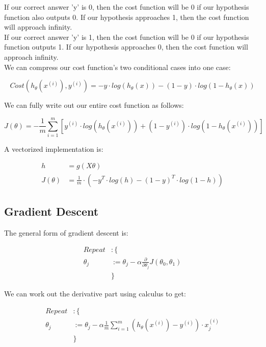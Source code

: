 If our correct answer 'y' is 0, then the cost function will be 0 if our hypothesis function also outputs 0. If our hypothesis approaches 1, then the cost function will approach infinity.\\

If our correct answer 'y' is 1, then the cost function will be 0 if our hypothesis function outputs 1. If our hypothesis approaches 0, then the cost function will approach infinity.\\

We can compress our cost function's two conditional cases into one case:

\begin{equation}
Cost(h_\theta(x^{(i)}),  y^{(i)}) = -y\cdot log(h_\theta(x)) -(1-y)\cdot log(1-h_\theta(x)) 
\end{equation}

We can fully write out our entire cost function as follows:

\begin{center}
$$J(\theta) = -\frac{1}{m}\sum_{i=1}^{m}\left[y^{(i)}\cdot log(h_\theta(x^{(i)})) +(1-y^{(i)})\cdot log(1-h_\theta(x^{(i)}))\right] $$
\end{center}

A vectorized implementation is:

\begin{align*}
h&=g(X\theta) \\
J(\theta)&=\frac{1}{m}\cdot(-y^T\cdot log(h)-(1-y)^T\cdot log(1-h))
\end{align*}

\subsection{Gradient Descent}

The general form of gradient descent is:

\begin{align*}
Repeat &: \{\\
\theta_j &:= \theta_j - \alpha \frac{\partial}{\partial \theta_j} J(\theta_0, \theta_1) \\
 &   \}
\end{align*}

We can work out the derivative part using calculus to get:


\begin{align*}
Repeat &: \{\\
\theta_j &:= \theta_j-\alpha \frac{1}{m} \sum_{i=1}^{m}\left(h_\theta(x^{(i)})-y^{(i)}\right)\cdot x^{(i)}_j \\
&   \}
\end{align*}

